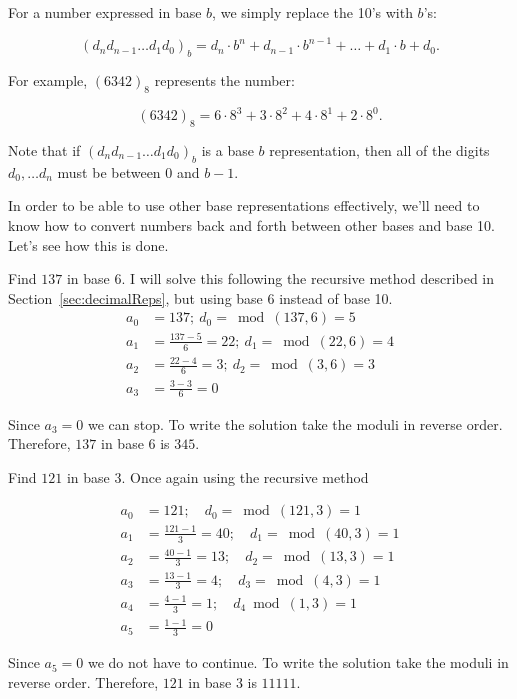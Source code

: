 For a number expressed in base $b$, we simply replace the 10's with $b$'s:

\begin{equation*}
(d_n d_{n-1} \ldots d_1 d_0)_b = d_n \cdot b^n + d_{n-1}\cdot b^{n-1} + \ldots + d_1 \cdot b + d_0.
\end{equation*}
 

For example, $(6342)_8$  represents the number:

\begin{equation*}
 (6342)_8 = 6 \cdot 8^3 + 3 \cdot 8^2 + 4 \cdot 8^1 + 2 \cdot 8^0.
\end{equation*}
 
 Note that if $(d_n d_{n-1} \ldots d_1 d_0)_b$ is a base $b$ representation, then all of the digits
 $d_0, \ldots d_n$ must be between 0 and $b-1$.

In order to be able to use other base representations effectively, we'll need to know how to convert numbers back and forth between 
other bases and base 10.  Let's see how this is done.

\begin{example}\label{example:bases:137 base 6}
Find $137$ in base $6$.
I will solve this following the recursive method described in Section~\ref{sec:decimalReps},  but using base 6 instead of base 10. 
\begin{align*}
a_{0}&=137;~d_{0}=\bmod(137,6)=5 \\
a_{1}&=\frac{137-5}{6}=22;~d_{1}=\bmod(22,6)=4 \\
a_{2}&=\frac{22-4}{6}=3;~d_{2}=\bmod(3,6)=3 \\
a_{3}&=\frac{3-3}{6}=0
\end{align*}

Since $a_{3}=0$ we can stop. To write the solution take the moduli in reverse order. Therefore, $137$ in base $6$ is $345$.
\end{example}

\begin{example}\label{example:bases:121 base 3}
Find $121$ in base $3$.  Once again using the recursive method

\begin{align*}
a_{0}&=121;\quad d_{0}=\bmod(121,3)=1 \\
a_{1}&=\frac{121-1}{3}=40;\quad d_{1}=\bmod(40,3)=1 \\
a_{2}&=\frac{40-1}{3}=13;\quad d_{2}=\bmod(13,3)=1 \\
a_{3}&=\frac{13-1}{3}=4;\quad d_{3}=\bmod(4,3)=1 \\
a_{4}&=\frac{4-1}{3}=1;\quad d_{4}\bmod(1,3)=1 \\
a_{5}&=\frac{1-1}{3}=0
\end{align*}

Since $a_{5}=0$ we do not have to continue. To write the solution take the moduli in reverse order. Therefore, $121$ in base $3$ is $11111$.
\end{example}


